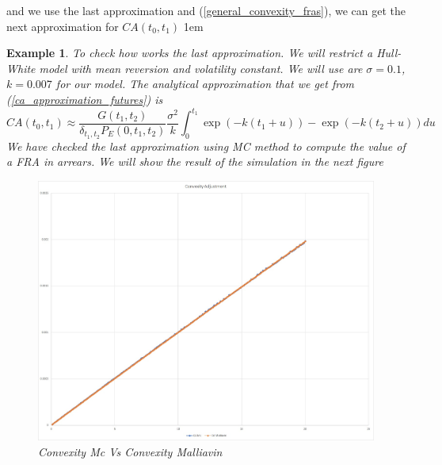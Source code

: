 \documentclass[a4paper,10pt]{article}
\newtheorem{example}[theorem]{Example}
\newcommand{\1}{\mathbf{1}}
\begin{document}
and we use the last approximation and (\ref{general_convexity_fras}), we can get the next approximation for $CA(t_0,t_1)$ 
\hspace{2cm}
\fboxsep1em
\begin{example}
To check how works the last approximation. We will restrict a Hull-White model with mean reversion and volatility constant. We will use are $\sigma=0.1$, $k=0.007$ for our model. The analytical approximation that we get from (\ref{ca_approximation_futures}) is
\begin{equation*}
CA(t_0,t_1) \approx \frac{G(t_1,t_2)}{\delta_{t_1,t_2}P_{E}(0,t_1,t_2)}  \frac{\sigma^{2}}{k} \int_{0}^{t_1} \exp(- k(t_1 + u)) -   \exp(- k(t_2 + u)) du 
\end{equation*}
We have checked the last approximation using MC method to compute the value of a FRA in arrears. We will show the result of the simulation in the next figure

\begin{figure}[h]
	\begin{center}
		\includegraphics[scale=0.3]{Figures/fra_convexity.jpg}
		\caption{Convexity Mc Vs Convexity Malliavin}
	\end{center}
\end{figure} 
 
\end{example}
\end{document}
